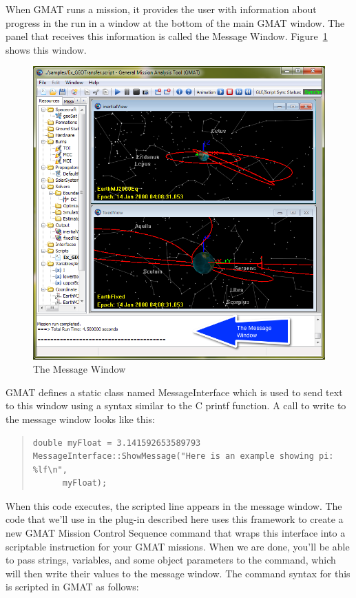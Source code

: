 \documentclass[10pt,letterpaper]{article}
\begin{document}
When GMAT runs a mission, it provides the user with information about progress in the run in a window at the bottom of the main GMAT window.  The panel that receives this information is called the Message Window.  Figure~\ref{msgWindow} shows this window.

\begin{figure}[htb]
\begin{center}
\includegraphics[scale=.5]{images/TheMessageWindow.png}
\caption{\label{msgWindow}The Message Window}
\end{center}
\end{figure}

\noindent GMAT defines a static class named MessageInterface which is used to send text to this window using a syntax similar to the C printf function.  A call to write to the message window looks like this:

\begin{quote}
\begin{verbatim}
double myFloat = 3.141592653589793
MessageInterface::ShowMessage("Here is an example showing pi: %lf\n",
      myFloat);
\end{verbatim}
\end{quote}

\noindent When this code executes, the scripted line appears in the message window.  The code that we'll use in the plug-in described here uses this framework to create a new GMAT Mission Control Sequence command that wraps this interface into a scriptable instruction for your GMAT missions.  When we are done, you'll be able to pass strings, variables, and some object parameters to the command, which will then write their values to the message window.  The command syntax for this is scripted in GMAT as follows:
\end{document}
